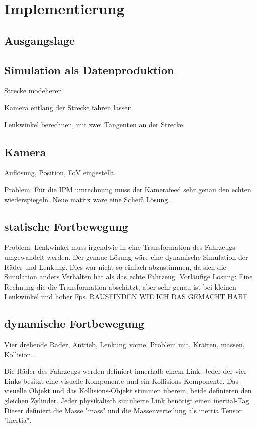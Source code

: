 
\chapter{Implementierung}

\section{Ausgangslage}

\section{Simulation als Datenproduktion}
Strecke modelieren

Kamera entlang der Strecke fahren lassen

Lenkwinkel berechnen, mit zwei Tangenten an der Strecke


\section{Kamera}
Auflösung, Position, FoV eingestellt.

Problem: Für die IPM umrechnung muss der Kamerafeed sehr genau den echten wiederspiegeln.
Neue matrix wäre eine Scheiß Lösung.


\section{statische Fortbewegung}
Problem: Lenkwinkel muss irgendwie in eine Transformation des Fahrzeugs umgewandelt werden.
Der genaue Lösung wäre eine dynamische Simulation der Räder und Lenkung.
Dies war nicht so einfach abzustimmen, da sich die Simulation anders Verhalten hat als das echte Fahrzeug.
Vorläufige Lösung: Eine Rechnung die die Transformation abschätzt, aber sehr genau ist bei kleinen Lenkwinkel und hoher Fps.
RAUSFINDEN WIE ICH DAS GEMACHT HABE


\section{dynamische Fortbewegung}
Vier drehende Räder, Antrieb, Lenkung vorne.
Problem mit, Kräften, massen, Kollision...

Die Räder des Fahrzeugs werden definiert innerhalb einem Link.
Jeder der vier Links besitzt eine visuelle Komponente und ein Kollisions-Komponente.
Das visuelle Objekt und das Kollisions-Objekt stimmen überein, beide definieren den gleichen Zylinder.
Jeder physikalisch simulierte Link benötigt einen inertial-Tag.
Dieser definiert die Masse "mass" und die Massenverteilung als inertia Tensor "inertia".

